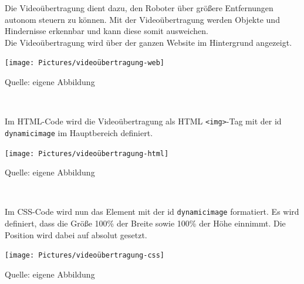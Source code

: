 \documentclass[ngerman,12pt,a4paper]{article}
\begin{document}
	Die Videoübertragung dient dazu, den Roboter über größere Entfernungen autonom steuern zu können. Mit der Videoübertragung werden Objekte und Hindernisse erkennbar und kann diese somit ausweichen. \\[0.5cm]
	Die Videoübertragung wird über der ganzen Website im Hintergrund angezeigt. \\[0.5cm]
	\begin{center}
		\begin{minipage}[t]{1\textwidth}
			\texttt{[image: Pictures/videoübertragung-web]}
			\label{fig:videoübertragung-web}
			\vspace{-10pt}
			\begin{center}
				\par\small Quelle: eigene Abbildung 
			\end{center}
		\end{minipage} \\[0.75cm]
	\end{center}
	Im HTML-Code wird die Videoübertragung als HTML \texttt{<img>}-Tag mit der id \texttt{dynamicimage} im Hauptbereich definiert. \\[0.5cm]
	\begin{center}
		\begin{minipage}[t]{0.75\textwidth}
			\texttt{[image: Pictures/videoübertragung-html]}
			\label{fig:videoübertragung-html}
			\vspace{-10pt}
			\begin{center}
				\par\small Quelle: eigene Abbildung 
			\end{center}
		\end{minipage} \\[0.75cm]
	\end{center}
	Im CSS-Code wird nun das Element mit der id \texttt{dynamicimage} formatiert. Es wird definiert, dass die Größe 100\% der Breite sowie 100\% der Höhe einnimmt. Die Position wird dabei auf absolut gesetzt. \\[0.5cm]
	\begin{center}
		\begin{minipage}[t]{0.5\textwidth}
			\texttt{[image: Pictures/videoübertragung-css]}
			\label{fig:videoübertragung-css}
			\vspace{-10pt}
			\begin{center}
				\par\small Quelle: eigene Abbildung 
			\end{center}
		\end{minipage} \\[0.75cm]
	\end{center}
\end{document}
